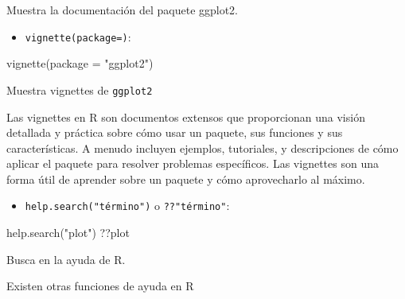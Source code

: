 \documentclass[
  letterpaper,
  DIV=11,
  numbers=noendperiod]{scrartcl}
\newenvironment{Shaded}{\begin{snugshade}}{\end{snugshade}}
\newcommand{\AttributeTok}[1]{\textcolor[rgb]{0.40,0.45,0.13}{#1}}
\newcommand{\FunctionTok}[1]{\textcolor[rgb]{0.28,0.35,0.67}{#1}}
\newcommand{\NormalTok}[1]{\textcolor[rgb]{0.00,0.23,0.31}{#1}}
\newcommand{\StringTok}[1]{\textcolor[rgb]{0.13,0.47,0.30}{#1}}
\providecommand{\tightlist}{%
  \setlength{\itemsep}{0pt}\setlength{\parskip}{0pt}}\usepackage{longtable,booktabs,array}
\begin{document}
Muestra la documentación del paquete ggplot2.

\begin{itemize}
\tightlist
\item
  \texttt{vignette(package=)}:
\end{itemize}

\begin{Shaded}
\begin{Highlighting}[]
\FunctionTok{vignette}\NormalTok{(}\AttributeTok{package =} \StringTok{"ggplot2"}\NormalTok{)}
\end{Highlighting}
\end{Shaded}

Muestra vignettes de \texttt{ggplot2}

Las vignettes en R son documentos extensos que proporcionan una visión
detallada y práctica sobre cómo usar un paquete, sus funciones y sus
características. A menudo incluyen ejemplos, tutoriales, y descripciones
de cómo aplicar el paquete para resolver problemas específicos. Las
vignettes son una forma útil de aprender sobre un paquete y cómo
aprovecharlo al máximo.

\begin{itemize}
\tightlist
\item
  \texttt{help.search("término")} o \texttt{??"término"}:
\end{itemize}

\begin{Shaded}
\begin{Highlighting}[]
\FunctionTok{help.search}\NormalTok{(}\StringTok{"plot"}\NormalTok{) }
\NormalTok{??plot}
\end{Highlighting}
\end{Shaded}

Busca en la ayuda de R.

Existen otras funciones de ayuda en R
\end{document}
